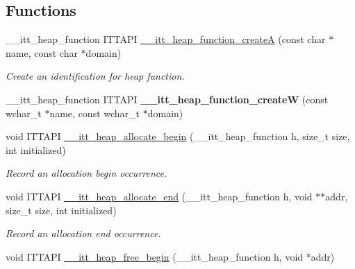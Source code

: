 \subsection*{Functions}
\begin{DoxyCompactItemize}
\item 
\+\_\+\+\_\+itt\+\_\+heap\+\_\+function I\+T\+T\+A\+P\+I \hyperlink{group__heap_gabbde8e9d232ceaf48c90adad4c1ce233}{\+\_\+\+\_\+itt\+\_\+heap\+\_\+function\+\_\+create\+A} (const char $\ast$name, const char $\ast$domain)
\begin{DoxyCompactList}\small\item\em Create an identification for heap function. \end{DoxyCompactList}\item 
\hypertarget{group__heap_ga90fea265a5509cd00e053d9b0d0ba020}{}\+\_\+\+\_\+itt\+\_\+heap\+\_\+function I\+T\+T\+A\+P\+I {\bfseries \+\_\+\+\_\+itt\+\_\+heap\+\_\+function\+\_\+create\+W} (const wchar\+\_\+t $\ast$name, const wchar\+\_\+t $\ast$domain)\label{group__heap_ga90fea265a5509cd00e053d9b0d0ba020}

\item 
\hypertarget{group__heap_gaf925d76e7660314a9f5bc10420053d28}{}void I\+T\+T\+A\+P\+I \hyperlink{group__heap_gaf925d76e7660314a9f5bc10420053d28}{\+\_\+\+\_\+itt\+\_\+heap\+\_\+allocate\+\_\+begin} (\+\_\+\+\_\+itt\+\_\+heap\+\_\+function h, size\+\_\+t size, int initialized)\label{group__heap_gaf925d76e7660314a9f5bc10420053d28}

\begin{DoxyCompactList}\small\item\em Record an allocation begin occurrence. \end{DoxyCompactList}\item 
\hypertarget{group__heap_ga28f07d01cc3333fa5e98531585a1b5d0}{}void I\+T\+T\+A\+P\+I \hyperlink{group__heap_ga28f07d01cc3333fa5e98531585a1b5d0}{\+\_\+\+\_\+itt\+\_\+heap\+\_\+allocate\+\_\+end} (\+\_\+\+\_\+itt\+\_\+heap\+\_\+function h, void $\ast$$\ast$addr, size\+\_\+t size, int initialized)\label{group__heap_ga28f07d01cc3333fa5e98531585a1b5d0}

\begin{DoxyCompactList}\small\item\em Record an allocation end occurrence. \end{DoxyCompactList}\item 
\hypertarget{group__heap_ga37cf3971eb7a4ffdcb2ec4a29c97ef7d}{}void I\+T\+T\+A\+P\+I \hyperlink{group__heap_ga37cf3971eb7a4ffdcb2ec4a29c97ef7d}{\+\_\+\+\_\+itt\+\_\+heap\+\_\+free\+\_\+begin} (\+\_\+\+\_\+itt\+\_\+heap\+\_\+function h, void $\ast$addr)\label{group__heap_ga37cf3971eb7a4ffdcb2ec4a29c97ef7d}


\end{DoxyCompactItemize}
